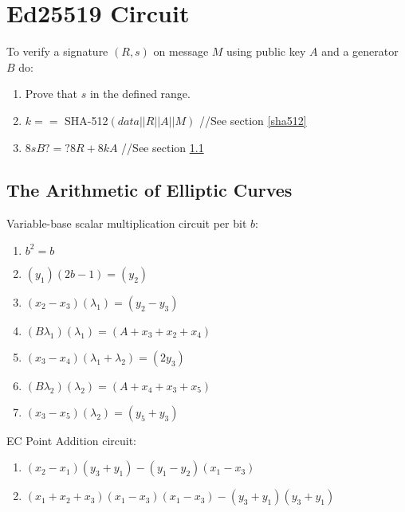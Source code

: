 \section{Ed25519 Circuit}
\label{section:eddsa}
To verify a signature $(R,s)$ on message $M$ using public key $A$ and a generator $B$ do:
\begin{enumerate}
\item Prove that $s$ in the defined range.
\item $k ==$ SHA-512$(data||R||A||M)$ //See section \ref{sha512}
\item $8sB ?=? 8R + 8kA$ //See section \ref{ellcurve}

\end{enumerate}

\subsection{The Arithmetic of Elliptic Curves} \label{ellcurve}
Variable-base scalar multiplication circuit per bit $b$:
\begin{enumerate}
\item $b^2 = b$
\item $(y_1)  (2b - 1) = (y_2)$
\item $ (x_2 - x_3)  (\lambda_1) = (y_2 - y_3)$
\item  $(B\lambda_1)  (\lambda_1) = (A + x_3 + x_2 + x_4)$
\item $ (x_3 - x_4)  (\lambda_1 + \lambda_2) = (2y_3)$
\item  $ (B\lambda_2)  (\lambda_2) = (A + x_4 + x_3 + x_5)$
\item  $ (x_3 - x_5)  (\lambda_2) = (y_5+ y_3)$
\end{enumerate}

EC Point Addition circuit:

\begin{enumerate}
\item $(x_2 - x_1)  (y_3 + y_1) - (y_1 - y_2)  (x_1 - x_3) $
\item $ (x_1 + x_2 + x_3)  (x_1 - x_3)  (x_1 - x_3) - (y_3 + y_1)  (y_3 + y_1)$
\end{enumerate}